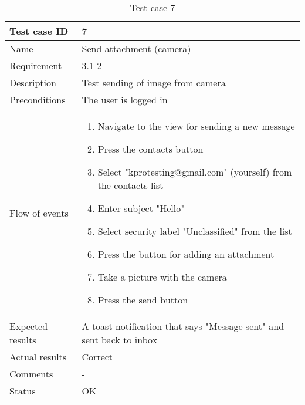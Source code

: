 		\begin{table}[htb]
			\begin{tabular}{l|p{10cm}}
				Test case ID & 7 \\ \hline
				Name & Send attachment (camera)\\ \hline
				Requirement & 3.1-2\\ \hline
				Description & Test sending of image from camera\\ \hline
				Preconditions & The user is logged in\\ \hline
				Flow of events & 
					\begin{enumerate}
						\item{}Navigate to the view for sending a new message
						\item{}Press the contacts button
						\item{}Select "kprotesting@gmail.com" (yourself) from the contacts list
						\item{}Enter subject "Hello"
						\item{}Select security label "Unclassified" from the list
						\item{}Press the button for adding an attachment
						\item{}Take a picture with the camera
						\item{}Press the send button
					\end{enumerate} \\ \hline
				Expected results & A toast notification that says "Message sent" and sent back to inbox\\ \hline
				Actual results & Correct\\ \hline
				Comments & -\\ \hline
				Status &OK \\ \hline
			\end{tabular}
			\caption{Test case 7} \label{tab:case7}
		\end{table}

